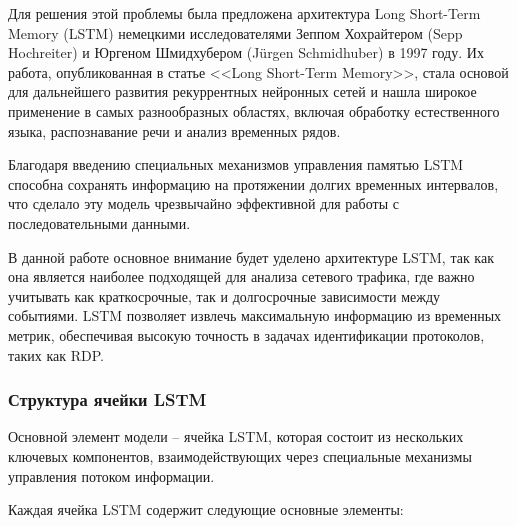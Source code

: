 \documentclass[spec, och, diploma]{SCWorks}
\begin{document}
  Для решения этой проблемы была предложена 
  архитектура Long Short-Term Memory (LSTM) немецкими исследователями Зеппом Хохрайтером (Sepp Hochreiter) и Юргеном Шмидхубером (Jürgen Schmidhuber) в 1997 году.
  Их работа, опубликованная в статье <<Long Short-Term Memory>>, стала основой для дальнейшего развития рекуррентных нейронных сетей и нашла широкое 
  применение в самых разнообразных областях, включая обработку естественного языка, распознавание речи и анализ временных рядов.

  Благодаря введению специальных механизмов управления памятью LSTM способна сохранять информацию на протяжении долгих временных интервалов, что сделало эту 
  модель чрезвычайно эффективной для работы с последовательными данными.

  В данной работе основное внимание будет уделено архитектуре LSTM, так как она является наиболее подходящей для анализа сетевого трафика, где важно учитывать как 
  краткосрочные, так и долгосрочные зависимости между событиями. LSTM позволяет извлечь максимальную информацию из временных метрик, обеспечивая высокую 
  точность в задачах идентификации протоколов, таких как RDP.

  \subsubsection{Структура ячейки LSTM}

  Основной элемент модели -- ячейка LSTM, которая состоит из нескольких ключевых компонентов, взаимодействующих через специальные механизмы управления 
  потоком информации.

  Каждая ячейка LSTM содержит следующие основные элементы:  
\end{document}
